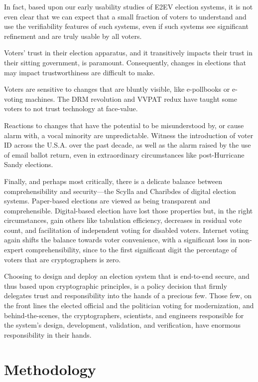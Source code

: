 In fact, based upon our early usability studies of E2EV election
systems, it is not even clear that we can expect that a small fraction
of voters to understand and use the verifiability features of such
systems, even if such systems see significant refinement and are
truly usable by all voters.

Voters' trust in their election apparatus, and it transitively impacts
their trust in their sitting government, is paramount. Consequently,
changes in elections that may impact trustworthiness are difficult to
make.

Voters are sensitive to changes that are bluntly visible, like
e-pollbooks or e-voting machines. The DRM revolution and VVPAT redux
have taught some voters to not trust technology at face-value.

Reactions to changes that have the potential to be misunderstood by,
or cause alarm with, a vocal minority are unpredictable. Witness the
introduction of voter ID across the U.S.A. over the past decade, as
well as the alarm raised by the use of email ballot return, even in
extraordinary circumstances like post-Hurricane Sandy elections.

Finally, and perhaps most critically, there is a delicate balance
between comprehensibility and security---the Scylla and Charibdes of
digital election systems. Paper-based elections are viewed as being
transparent and comprehensible. Digital-based election have lost those
properties but, in the right circumstances, gain others like
tabulation efficiency, decreases in residual vote count, and
facilitation of independent voting for disabled voters. Internet
voting again shifts the balance towards voter convenience, with a
significant loss in non-expert comprehensibility, since to the first
significant digit the percentage of voters that are cryptographers is
zero.

Choosing to design and deploy an election system that is end-to-end
secure, and thus based upon cryptographic principles, is a policy
decision that firmly delegates trust and responsibility into the hands
of a precious few.  Those few, on the front lines the elected official
and the politician voting for modernization, and behind-the-scenes,
the cryptographers, scientists, and engineers responsible for the
system's design, development, validation, and verification, have
enormous responsibility in their hands.

\section{Methodology}

